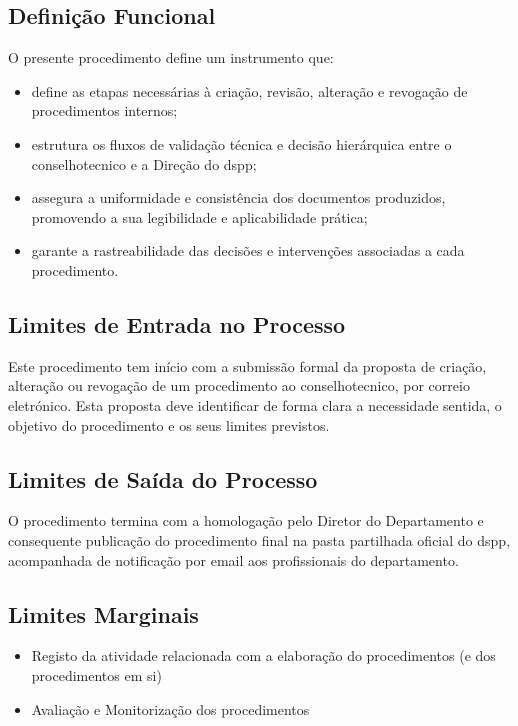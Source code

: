     \subsection{Definição Funcional}\label{subsec:definicao-funcional}

    O presente procedimento define um instrumento que:
    \begin{itemize}
        \item define as etapas necessárias à criação, revisão, alteração e revogação de procedimentos internos;
        \item estrutura os fluxos de validação técnica e decisão hierárquica entre o \gls{conselhotecnico} e a Direção do \gls{dspp};
        \item assegura a uniformidade e consistência dos documentos produzidos, promovendo a sua legibilidade e aplicabilidade prática;
        \item garante a rastreabilidade das decisões e intervenções associadas a cada procedimento.
    \end{itemize}
    
    \subsection{Limites de Entrada no Processo}\label{subsec:limites-de-entrada-no-processo}

    Este procedimento tem início com a submissão formal da proposta de criação, alteração ou revogação de um procedimento ao \gls{conselhotecnico}, por correio eletrónico. Esta proposta deve identificar de forma clara a necessidade sentida, o objetivo do procedimento e os seus limites previstos.

    \subsection{Limites de Saída do Processo}\label{subsec:limites-de-saida-do-processo}

    O procedimento termina com a homologação pelo Diretor do Departamento e consequente publicação do procedimento final na pasta partilhada oficial do \gls{dspp}, acompanhada de notificação por email aos profissionais do departamento.

    \subsection{Limites Marginais}\label{subsec:limites-marginais}

    \begin{itemize}
        \item Registo da atividade relacionada com a elaboração do procedimentos (e dos procedimentos em si)
        \item Avaliação e Monitorização dos procedimentos
    \end{itemize}


